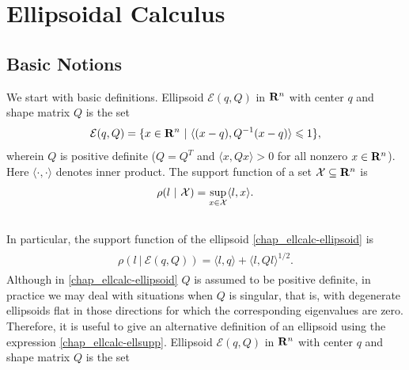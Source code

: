 \documentclass[letterpaper,10pt,english]{sphinxmanual}
\begin{document}
\chapter{Ellipsoidal Calculus}
\label{chap_ellcalc:ellipsoidal-calculus}\label{chap_ellcalc::doc}

\section{Basic Notions}
\label{chap_ellcalc:basic-notions}
We start with basic definitions.
Ellipsoid ${\mathcal E}(q,Q)$ in
${\bf R}^n$ with center $q$ and shape matrix $Q$ is
the set
\label{chap_ellcalc:equation-ellipsoid}\begin{gather}
\begin{split}{\mathcal E}(q,Q) = \{ x \in {\bf R}^n ~|~ \langle (x-q), Q^{-1}(x-q)\rangle\leqslant1 \},\end{split}\label{chap_ellcalc-ellipsoid}
\end{gather}
wherein $Q$ is positive definite ($Q=Q^T$ and
$\langle x, Qx\rangle>0$ for all nonzero $x\in{\bf R}^n$).
Here $\langle\cdot,\cdot\rangle$ denotes inner
product. The support function of a set
${\mathcal X}\subseteq{\bf R}^n$ is
\begin{gather}
\begin{split}\rho(l~|~{\mathcal X}) = \sup_{x\in{\mathcal X}} \langle l,x\rangle.\end{split}\notag\\\begin{split}\end{split}\notag
\end{gather}
In particular, the support function of the ellipsoid \eqref{chap_ellcalc-ellipsoid} is
\label{chap_ellcalc:equation-ellsupp}\begin{gather}
\begin{split}\rho(l~|~{\mathcal E}(q,Q)) = \langle l, q\rangle + \langle l, Ql\rangle^{1/2}.\end{split}\label{chap_ellcalc-ellsupp}
\end{gather}
Although in \eqref{chap_ellcalc-ellipsoid} $Q$ is assumed to be positive definite,
in practice we may deal with situations when $Q$ is singular, that
is, with degenerate ellipsoids flat in those directions for which the
corresponding eigenvalues are zero. Therefore, it is useful to give an
alternative definition of an ellipsoid using the expression \eqref{chap_ellcalc-ellsupp}.
Ellipsoid ${\mathcal E}(q,Q)$ in ${\bf R}^n$ with center
$q$ and shape matrix $Q$ is the set
\end{document}
